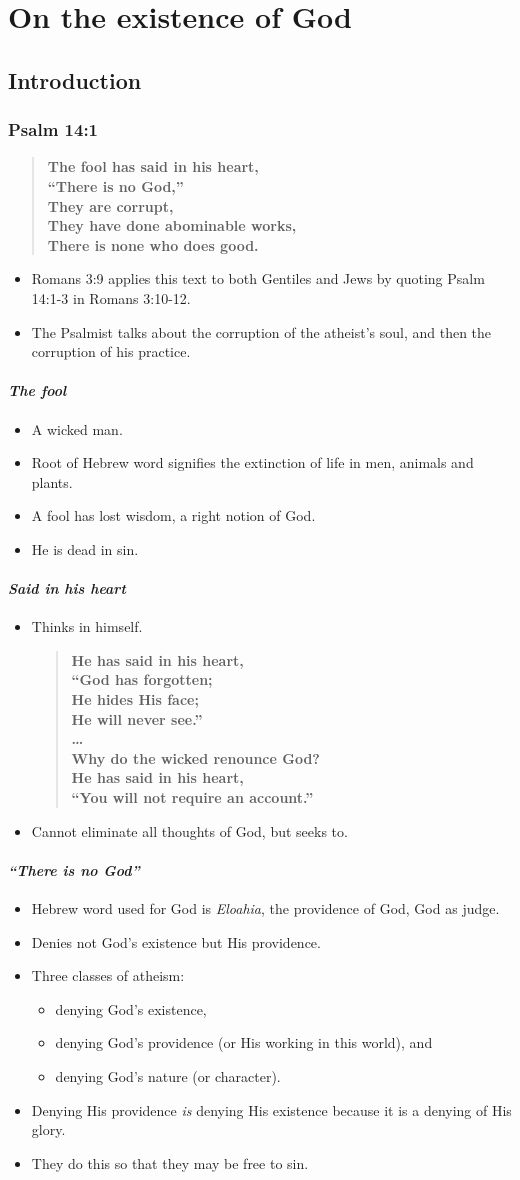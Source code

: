 \documentclass{book}
\newcommand{\BI}{\begin{itemize}\item}
\newcommand{\EI}{\end{itemize}}
\newcommand{\I}{\item}
\newcommand{\Q}[2]{\begin{quote} \textbf{#2 \center{#1}}\end{quote}}
\begin{document}
\tableofcontents
\part{On the existence of God}
\chapter{Introduction}
\section{Psalm 14:1}
\Q{Psalm 14:1}
    {The fool has said in his heart,\\
    ``There is no God,''\\
    They are corrupt, \\
    They have done abominable works, \\
    There is none who does good.}
\BI Romans 3:9 applies this text to both Gentiles and Jews
    by quoting Psalm 14:1-3 in Romans 3:10-12.
\I  The Psalmist talks about the corruption of the atheist's soul,
    and then the corruption of his practice.  \EI

\subsection{\emph{The fool}}
\BI A wicked man.
\I  Root of Hebrew word signifies the extinction of life
    in men, animals and plants.
\I  A fool has lost wisdom, a right notion of God.
\I  He is dead in sin. \EI

\subsection{\emph{Said in his heart}}
\BI Thinks in himself.
    \Q{Psalm 10:11,13}
    {He has said in his heart, \\
    ``God has forgotten; \\
    He hides His face; \\
    He will never see.'' \\
    \ldots \\
    Why do the wicked renounce God? \\
    He has said in his heart, \\
    ``You will not require an account.''}

\I  Cannot eliminate all thoughts of God, but seeks to. \EI

\subsection{\emph{``There is no God''}}
\BI Hebrew word used for God is \emph{Eloahia},
    the providence of God, God as judge.
\I  Denies not God's existence but His providence.
\I  Three classes of atheism:
    \BI denying God's existence,
    \I  denying God's providence (or His working in this world), and 
    \I  denying God's nature (or character). \EI
\I  Denying His providence \emph{is} denying His existence
    because it is a denying of His glory.
\I  They do this so that they may be free to sin. \EI
\end{document}

